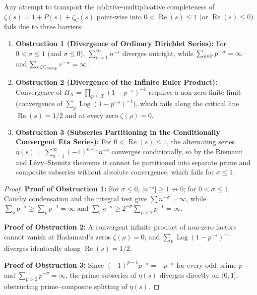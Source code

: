 \begin{theorem}
\label{thm:three_obstructions}
\leanok
Any attempt to transport the additive-multiplicative completeness of $\zeta(s) = 1 + P(s) + \zeta_C(s)$ point-wise into $0 < \operatorname{Re}(s) \le 1$ (or $\operatorname{Re}(s) \le 0$) fails due to three barriers:
\begin{enumerate}
  \item \textbf{Obstruction 1 (Divergence of Ordinary Dirichlet Series):} For $0 < \sigma \le 1$ (and $\sigma \le 0$), $\sum_{n=1}^\infty n^{-s}$ diverges outright, while $\sum_{p \in \mathbb{P}} p^{-\sigma} = \infty$ and $\sum_{c \in \mathbb{C}_{\mathrm{comp}}} c^{-\sigma} = \infty$.
  \item \textbf{Obstruction 2 (Divergence of the Infinite Euler Product):} Convergence of $\Pi_X = \prod_{p \le X}(1 - p^{-s})^{-1}$ requires a non-zero finite limit (convergence of $\sum_p \operatorname{Log}(1 - p^{-s})^{-1}$), which fails along the critical line $\operatorname{Re}(s) = 1/2$ and at every zero $\zeta(\rho) = 0$.
  \item \textbf{Obstruction 3 (Subseries Partitioning in the Conditionally Convergent Eta Series):} For $0 < \operatorname{Re}(s) \le 1$, the alternating series $\eta(s) = \sum_{n=1}^\infty (-1)^{n-1} n^{-s}$ converges conditionally, so by the Riemann and L\'evy--Steinitz theorems it cannot be partitioned into separate prime and composite subseries without absolute convergence, which fails for $\sigma \le 1$.
\end{enumerate}
\end{theorem}

\begin{proof}
\leanok
\textbf{Proof of Obstruction 1:} For $\sigma \le 0$, $|n^{-s}| \ge 1 \not\to 0$; for $0 < \sigma \le 1$, Cauchy condensation and the integral test give $\sum n^{-\sigma} = \infty$, while $\sum_{p} p^{-\sigma} \ge \sum_p p^{-1} = \infty$ and $\sum_{c} c^{-\sigma} \ge 2^{-\sigma}\sum_{p>2} p^{-1} = \infty$.

\textbf{Proof of Obstruction 2:} A convergent infinite product of non-zero factors cannot vanish at Hadamard's zeros $\zeta(\rho) = 0$, and $\sum_p \operatorname{Log}(1 - p^{-s})^{-1}$ diverges identically along $\operatorname{Re}(s) = 1/2$.

\textbf{Proof of Obstruction 3:} Since $(-1)^{p-1} p^{-\sigma} = -p^{-\sigma}$ for every odd prime $p$ and $\sum_{p>2} p^{-\sigma} = \infty$, the prime subseries of $\eta(s)$ diverges directly on $(0, 1]$, obstructing prime--composite splitting of $\eta(s)$.
\end{proof}

